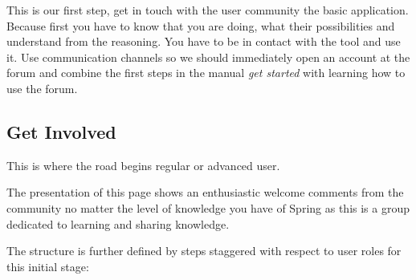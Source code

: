 \documentclass[11pt]{scrartcl}
\begin{document}
\par This is our first step, get in touch with the user community the basic application. Because first you have to know that you are doing, what their possibilities and understand from the reasoning. You have to be in contact with the tool and use it. Use communication channels so we should immediately open an account at the forum and combine the first steps in the manual \emph{get started} with learning how to use the forum.

\subsection{Get Involved}

\par This is where the road begins regular or advanced user.

\par The presentation of this page shows an enthusiastic welcome comments from the community no matter the level of knowledge you have of Spring as this is a group dedicated to learning and sharing knowledge.

\par The structure is further defined by steps staggered with respect to user roles for this initial stage:
\end{document}
